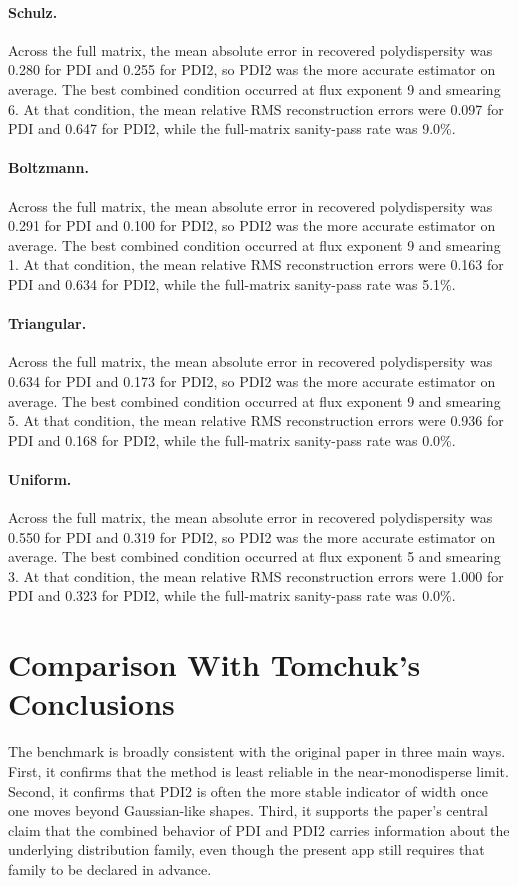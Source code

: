 \documentclass[11pt]{article}
\begin{document}
\paragraph{Schulz.} Across the full matrix, the mean absolute error in recovered polydispersity was 0.280 for PDI and 0.255 for PDI2, so PDI2 was the more accurate estimator on average. The best combined condition occurred at flux exponent 9 and smearing 6. At that condition, the mean relative RMS reconstruction errors were 0.097 for PDI and 0.647 for PDI2, while the full-matrix sanity-pass rate was 9.0\%.
\paragraph{Boltzmann.} Across the full matrix, the mean absolute error in recovered polydispersity was 0.291 for PDI and 0.100 for PDI2, so PDI2 was the more accurate estimator on average. The best combined condition occurred at flux exponent 9 and smearing 1. At that condition, the mean relative RMS reconstruction errors were 0.163 for PDI and 0.634 for PDI2, while the full-matrix sanity-pass rate was 5.1\%.
\paragraph{Triangular.} Across the full matrix, the mean absolute error in recovered polydispersity was 0.634 for PDI and 0.173 for PDI2, so PDI2 was the more accurate estimator on average. The best combined condition occurred at flux exponent 9 and smearing 5. At that condition, the mean relative RMS reconstruction errors were 0.936 for PDI and 0.168 for PDI2, while the full-matrix sanity-pass rate was 0.0\%.
\paragraph{Uniform.} Across the full matrix, the mean absolute error in recovered polydispersity was 0.550 for PDI and 0.319 for PDI2, so PDI2 was the more accurate estimator on average. The best combined condition occurred at flux exponent 5 and smearing 3. At that condition, the mean relative RMS reconstruction errors were 1.000 for PDI and 0.323 for PDI2, while the full-matrix sanity-pass rate was 0.0\%.

\section{Comparison With Tomchuk's Conclusions}
The benchmark is broadly consistent with the original paper in three main ways.
First, it confirms that the method is least reliable in the near-monodisperse limit.
Second, it confirms that PDI2 is often the more stable indicator of width once one moves beyond Gaussian-like shapes.
Third, it supports the paper's central claim that the combined behavior of PDI and PDI2 carries information about the underlying distribution family, even though the present app still requires that family to be declared in advance.
\end{document}
